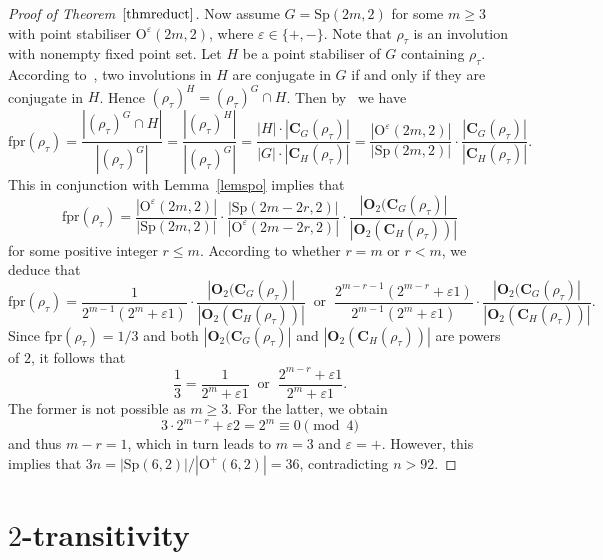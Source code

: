 \documentclass[11pt,a4paper,reqno]{amsart}
\newcommand{\fpr}{\mathrm{fpr}}
\newcommand{\rmO}{\mathrm{O}}
\newcommand{\Sp}{\mathrm{Sp}}
\theoremstyle{definition}
\begin{document}
\begin{proof}[Proof of Theorem~$\ref{thmreduct}$]
Now assume $G=\Sp(2m,2)$ for some $m\geq3$ with point stabiliser $\mathrm{O}^\varepsilon(2m,2)$, where $\varepsilon\in\{+,-\}$.
Note that $\rho_\tau$ is an involution with nonempty fixed point set. Let $H$ be a point stabiliser of $G$ containing $\rho_\tau$.
According to~\cite[(8.5)]{AS1976}, two involutions in $H$ are conjugate in $G$ if and only if they are conjugate in $H$. Hence $(\rho_\tau)^H=(\rho_\tau)^G\cap H$. Then by~\cite[Lemma~1.2(iii)]{Burness2018} we have
\[
\fpr(\rho_\tau)=\frac{|(\rho_\tau)^G\cap H|}{|(\rho_\tau)^G|}=\frac{|(\rho_\tau)^{H}|}{|(\rho_\tau)^{G}|}
=\frac{|H|\cdot|\mathbf{C}_{G}(\rho_\tau)|}{|G|\cdot|\mathbf{C}_{H}(\rho_\tau)|}
=\frac{|\mathrm{O}^\varepsilon(2m,2)|}{|\Sp(2m,2)|}\cdot\frac{|\mathbf{C}_{G}(\rho_\tau)|}{|\mathbf{C}_{H}(\rho_\tau)|}.
\]
This in conjunction with Lemma~\ref{lemspo} implies that
\[
\fpr(\rho_\tau)=\frac{|\mathrm{O}^\varepsilon(2m,2)|}{|\Sp(2m,2)|}\cdot\frac{|\Sp(2m-2r,2)|}{|\rmO^{\varepsilon}(2m-2r,2)|}
\cdot\frac{|\mathbf{O}_2(\mathbf{C}_{G}(\rho_\tau)|}{|\mathbf{O}_2(\mathbf{C}_{H}(\rho_\tau))|}
\]
for some positive integer $r\leq m$. According to whether $r=m$ or $r<m$, we deduce that
\[
\fpr(\rho_\tau)=\frac{1}{2^{m-1}(2^m+\varepsilon1)}\cdot\frac{|\mathbf{O}_2(\mathbf{C}_{G}(\rho_\tau)|}{|\mathbf{O}_2(\mathbf{C}_{H}(\rho_\tau))|}\ \text{ or }\ \frac{2^{m-r-1}(2^{m-r}+\varepsilon1)}{2^{m-1}(2^m+\varepsilon1)}
\cdot\frac{|\mathbf{O}_2(\mathbf{C}_{G}(\rho_\tau)|}{|\mathbf{O}_2(\mathbf{C}_{H}(\rho_\tau))|}.
\]
Since $\fpr(\rho_\tau)=1/3$ and both $|\mathbf{O}_2(\mathbf{C}_{G}(\rho_\tau)|$ and $|\mathbf{O}_2(\mathbf{C}_{H}(\rho_\tau))|$ are powers of $2$, it follows that
\[
\frac{1}{3}=\frac{1}{2^m+\varepsilon1}\ \text{ or }\ \frac{2^{m-r}+\varepsilon1}{2^m+\varepsilon1}.
\]
The former is not possible as $m\geq3$. For the latter, we obtain
\[
3\cdot2^{m-r}+\varepsilon2=2^m\equiv0\pmod{4}
\]
and thus $m-r=1$, which in turn leads to $m=3$ and $\varepsilon=+$. However, this implies that $3n=|\Sp(6,2)|/|\rmO^+(6,2)|=36$, contradicting $n>92$.
\end{proof}

\section{$2$-transitivity}\label{sec4}
\end{document}
